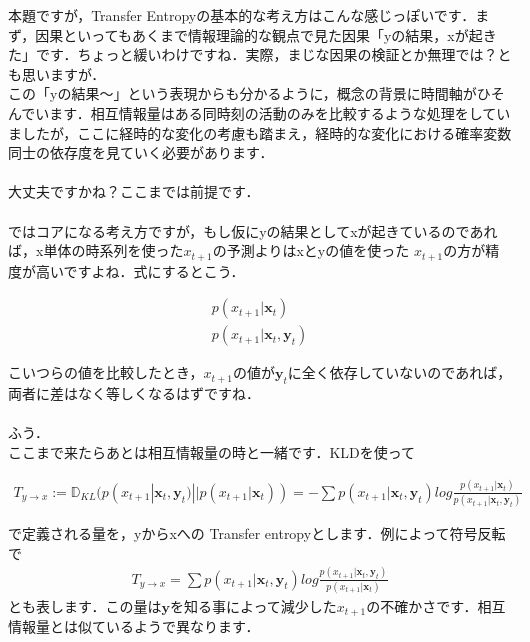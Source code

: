 \documentclass[11pt,a4paper,uplatex]{ujreport}
\begin{document}
本題ですが，Transfer Entropyの基本的な考え方はこんな感じっぽいです．まず，因果といってもあくまで情報理論的な観点で見た因果「yの結果，xが起きた」です．ちょっと緩いわけですね．実際，まじな因果の検証とか無理では？とも思いますが．\\

この「yの結果～」という表現からも分かるように，概念の背景に時間軸がひそんでいます．相互情報量はある同時刻の活動のみを比較するような処理をしていましたが，ここに経時的な変化の考慮も踏まえ，経時的な変化における確率変数同士の依存度を見ていく必要があります．\\
\\

大丈夫ですかね？ここまでは前提です．\\
\\

ではコアになる考え方ですが，もし仮にyの結果としてxが起きているのであれば，x単体の時系列を使った$x_{t+1}$の予測よりはxとyの値を使った $x_{t+1}$の方が精度が高いですよね．式にするとこう．

\begin{eqnarray}
\label{eq:TL1}
  p(x_{t+1}| \mathbf{x}_t) \nonumber \\
  p(x_{t+1}| \mathbf{x}_t, \mathbf{y}_t) \nonumber
\end{eqnarray}

こいつらの値を比較したとき，$x_{t+1}$の値が$\mathbf{y}_t$に全く依存していないのであれば，両者に差はなく等しくなるはずですね．\\
\\

ふう．
\\

ここまで来たらあとは相互情報量の時と一緒です．KLDを使って

\begin{eqnarray}
\label{eq:TE1}
  T_{y\rightarrow x} := \mathbb{D}_{KL}(p(x_{t+1}| \mathbf{x}_t, \mathbf{y}_t) || p(x_{t+1}| \mathbf{x}_t)) = -\sum p(x_{t+1}| \mathbf{x}_t, \mathbf{y}_t) log \frac{p(x_{t+1}| \mathbf{x}_t)}{p(x_{t+1}| \mathbf{x}_t, \mathbf{y}_t)} 
\end{eqnarray}

で定義される量を，yからxへの Transfer entropyとします．例によって符号反転で
\begin{eqnarray}
\label{eq:TE2}
  T_{y\rightarrow x} = \sum p(x_{t+1}| \mathbf{x}_t, \mathbf{y}_t) log \frac{p(x_{t+1}| \mathbf{x}_t, \mathbf{y}_t)}{p(x_{t+1}| \mathbf{x}_t)} 
\end{eqnarray}
とも表します．この量は$\mathbf{y}$を知る事によって減少した$x_{t+1}$の不確かさです．相互情報量とは似ているようで異なります．\\
\\
\end{document}
